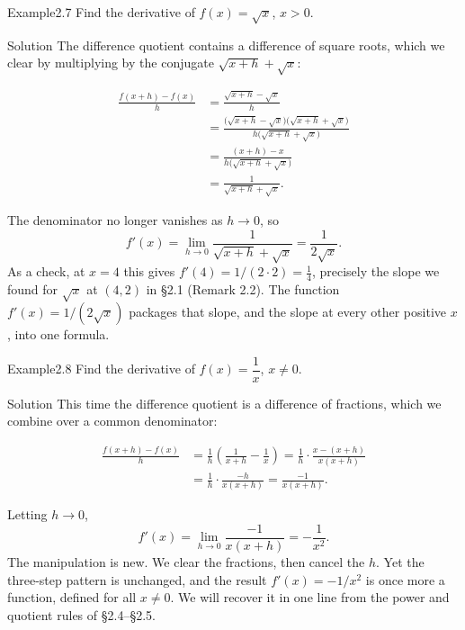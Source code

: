 \documentclass[a4paper,12pt,oneside]{memoir}
\begin{document}
\begin{workedexample}
\begin{envexample}{Example}{2.7}{}
Find the derivative of \(f(x) = \sqrt{x}\), \(x > 0\).
\end{envexample}
\begin{envsolution}{Solution}{}{}
The difference quotient contains a difference of square roots, which we clear by multiplying by the conjugate \(\sqrt{x + h} + \sqrt{x}\):

\[ \begin{aligned}
          \frac{f(x + h) - f(x)}{h}
            &= \frac{\sqrt{x + h} - \sqrt{x}}{h} \\[4pt]
            &= \frac{\bigl(\sqrt{x + h} - \sqrt{x}\bigr)\bigl(\sqrt{x + h} + \sqrt{x}\bigr)}{h\bigl(\sqrt{x + h} + \sqrt{x}\bigr)} \\[4pt]
            &= \frac{(x + h) - x}{h\bigl(\sqrt{x + h} + \sqrt{x}\bigr)} \\[4pt]
            &= \frac{1}{\sqrt{x + h} + \sqrt{x}}.
        \end{aligned} \]

The denominator no longer vanishes as \(h \to 0\), so \[ f'(x) = \lim_{h \to 0} \frac{1}{\sqrt{x + h} + \sqrt{x}} = \frac{1}{2\sqrt{x}}. \] As a check, at \(x = 4\) this gives \(f'(4) = 1/(2 \cdot 2) = \tfrac{1}{4}\), precisely the slope we found for \(\sqrt{x}\) at \((4, 2)\) in §2.1 (Remark 2.2). The function \(f'(x) = 1/(2\sqrt{x})\) packages that slope, and the slope at every other positive \(x\), into one formula.
\end{envsolution}
\end{workedexample}
\begin{workedexample}
\begin{envexample}{Example}{2.8}{}
Find the derivative of \(f(x) = \dfrac{1}{x}\), \(x \ne 0\).
\end{envexample}
\begin{envsolution}{Solution}{}{}
This time the difference quotient is a difference of fractions, which we combine over a common denominator:

\[ \begin{aligned}
          \frac{f(x + h) - f(x)}{h}
            &= \frac{1}{h}\left( \frac{1}{x + h} - \frac{1}{x} \right)
             = \frac{1}{h} \cdot \frac{x - (x + h)}{x(x + h)} \\[4pt]
            &= \frac{1}{h} \cdot \frac{-h}{x(x + h)}
             = \frac{-1}{x(x + h)}.
        \end{aligned} \]

Letting \(h \to 0\), \[ f'(x) = \lim_{h \to 0} \frac{-1}{x(x + h)} = -\frac{1}{x^{2}}. \] The manipulation is new. We clear the fractions, then cancel the \(h\). Yet the three-step pattern is unchanged, and the result \(f'(x) = -1/x^{2}\) is once more a function, defined for all \(x \ne 0\). We will recover it in one line from the power and quotient rules of §2.4–§2.5.
\end{envsolution}
\end{workedexample}
\end{document}
